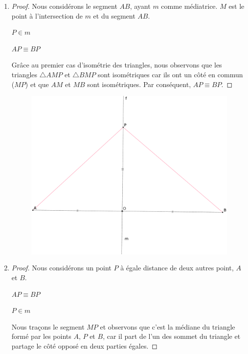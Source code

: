 \documentclass[a4paper,12pt]{article}
\begin{document}
\begin{enumerate}
    \item \begin{proof}
    Nous considérons le segment $AB$, ayant $m$ comme médiatrice. $M$ est le point à l'intersection de $m$ et du segment $AB$.
    
    \begin{hyp}
    $P \in m$ 
    \end{hyp}
    \begin{concl}
    $AP \equiv BP$
    \end{concl}
     
    Grâce au premier cas d'isométrie des triangles, nous observons que les triangles $\triangle AMP$ et $\triangle BMP$ sont isométriques car ils ont un côté en commun ($MP$) et que $AM$ et $MB$ sont isométriques. Par conséquent, $AP \equiv BP$.
     \end{proof}
     
      \begin{figure}[H]
        \centering
        \includegraphics[scale=0.17]{mediatrice1.eps}
    \end{figure}
    
    
     
    \item \begin{proof}
         Nous considérons un point $P$ à égale distance de deux autres point, $A$ et $B$. 
        
        \begin{hyp}
        $AP \equiv BP$
        \end{hyp}
        \begin{concl}
        $P \in m$
        \end{concl}
        Nous traçons le segment $MP$ et observons que c'est la médiane du triangle formé par les points $A$, $P$ et $B$, car il part        de l'un des sommet du triangle et partage le côté opposé en deux parties égales. 
        

\end{proof}
\end{enumerate}
\end{document}

